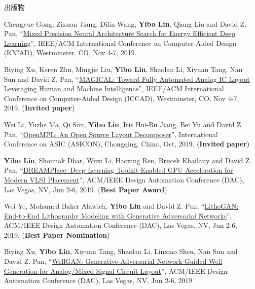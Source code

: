 \begin{rSection}{出版物}
\begin{description}[font=\normalfont, rightmargin=2em]
{}
            

\item[{[C31]}]{
        Chengyue Gong, Zixuan Jiang, Dilin Wang, \textbf{Yibo Lin}, Qiang Liu and David Z. Pan, 
    ``\href{https://doi.org/10.1109/ICCAD45719.2019.8942147}{Mixed Precision Neural Architecture Search for Energy Efficient Deep Learning}'', 
    IEEE/ACM International Conference on Computer-Aided Design (ICCAD), Westminster, CO, Nov 4-7, 2019.
    
}
            

\item[{[C30]}]{
        Biying Xu, Keren Zhu, Mingjie Liu, \textbf{Yibo Lin}, Shaolan Li, Xiyuan Tang, Nan Sun and David Z. Pan, 
    ``\href{https://doi.org/10.1109/ICCAD45719.2019.8942060}{MAGICAL: Toward Fully Automated Analog IC Layout Leveraging Human and Machine Intelligence}'', 
    IEEE/ACM International Conference on Computer-Aided Design (ICCAD), Westminster, CO, Nov 4-7, 2019.
    (\textbf{Invited paper})
}
            

\item[{[C29]}]{
        Wei Li, Yuzhe Ma, Qi Sun, \textbf{Yibo Lin}, Iris Hui-Ru Jiang, Bei Yu and David Z Pan, 
    ``\href{https://arxiv.org/abs/1809.07554}{OpenMPL: An Open Source Layout Decomposer}'', 
    International Conference on ASIC (ASICON), Chongqing, China, Oct, 2019.
    (\textbf{Invited paper})
}
            

\item[{[C28]}]{
        \textbf{Yibo Lin}, Shounak Dhar, Wuxi Li, Haoxing Ren, Brucek Khailany and David Z. Pan, 
    ``\href{https://doi.org/10.1145/3316781.3317803}{DREAMPlace: Deep Learning Toolkit-Enabled GPU Acceleration for Modern VLSI Placement}'', 
    ACM/IEEE Design Automation Conference (DAC), Las Vegas, NV, Jun 2-6, 2019.
    (\textbf{Best Paper Award})
}
            

\item[{[C27]}]{
        Wei Ye, Mohamed Baker Alawieh, \textbf{Yibo Lin} and David Z. Pan, 
    ``\href{https://doi.org/10.1145/3316781.3317852}{LithoGAN: End-to-End Lithography Modeling with Generative Adversarial Networks}'', 
    ACM/IEEE Design Automation Conference (DAC), Las Vegas, NV, Jun 2-6, 2019.
    (\textbf{Best Paper Nomination})
}
            

\item[{[C26]}]{
        Biying Xu, \textbf{Yibo Lin}, Xiyuan Tang, Shaolan Li, Linxiao Shen, Nan Sun and David Z. Pan, 
    ``\href{https://doi.org/10.1145/3316781.3317930}{WellGAN: Generative-Adversarial-Network-Guided Well Generation for Analog/Mixed-Signal Circuit Layout}'', 
    ACM/IEEE Design Automation Conference (DAC), Las Vegas, NV, Jun 2-6, 2019.
    
}
\end{description}
\end{rSection}
